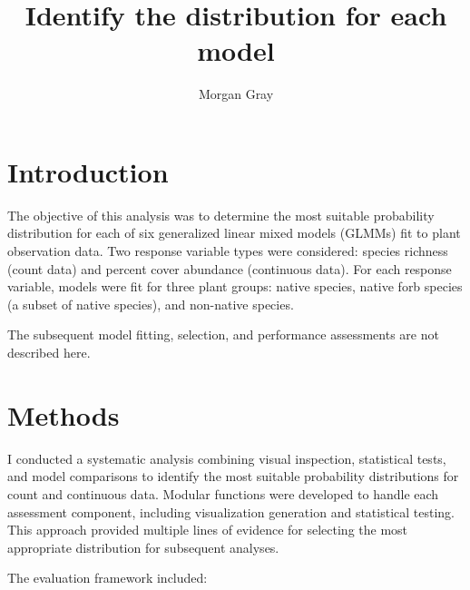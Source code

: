 \documentclass[
  letterpaper,
  DIV=11,
  numbers=noendperiod]{scrartcl}
\title{Identify the distribution for each model}
\author{Morgan Gray}
\date{}
\renewcommand*\contentsname{Table of contents}
\newcommand\contentsname{Table of contents}
\begin{document}
\maketitle

\renewcommand*\contentsname{Contents}
{
\hypersetup{linkcolor=}
\setcounter{tocdepth}{3}
\tableofcontents
}

\section{Introduction}\label{introduction}

The objective of this analysis was to determine the most suitable
probability distribution for each of six generalized linear mixed models
(GLMMs) fit to plant observation data. Two response variable types were
considered: species richness (count data) and percent cover abundance
(continuous data). For each response variable, models were fit for three
plant groups: native species, native forb species (a subset of native
species), and non-native species.

\begin{tcolorbox}[enhanced jigsaw, rightrule=.15mm, breakable, colbacktitle=quarto-callout-note-color!10!white, left=2mm, colframe=quarto-callout-note-color-frame, coltitle=black, opacitybacktitle=0.6, colback=white, toprule=.15mm, titlerule=0mm, opacityback=0, leftrule=.75mm, bottomtitle=1mm, toptitle=1mm, title=\textcolor{quarto-callout-note-color}{\faInfo}\hspace{0.5em}{Note}, arc=.35mm, bottomrule=.15mm]

The subsequent model fitting, selection, and performance assessments are
not described here.

\end{tcolorbox}

\section{Methods}\label{methods}

I conducted a systematic analysis combining visual inspection,
statistical tests, and model comparisons to identify the most suitable
probability distributions for count and continuous data. Modular
functions were developed to handle each assessment component, including
visualization generation and statistical testing. This approach provided
multiple lines of evidence for selecting the most appropriate
distribution for subsequent analyses.

The evaluation framework included:
\end{document}
